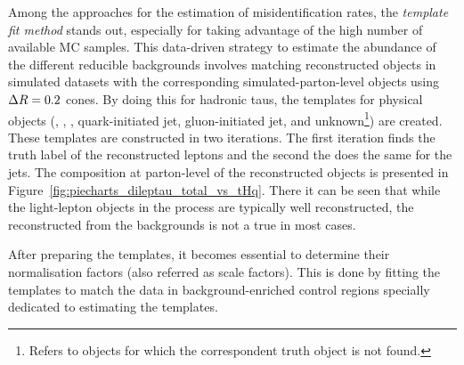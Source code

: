 

Among the approaches for the estimation of misidentification rates, the \textit{template fit method} stands out, 
especially for taking advantage of the high number of available MC samples. This data-driven strategy to estimate the 
abundance of the different reducible backgrounds involves matching reconstructed objects in simulated 
datasets with the corresponding simulated-parton-level objects using $\Delta R=0.2$ cones. By doing this for hadronic taus, the 
templates for physical objects (\Pe, \Pmu, \tauhad, quark-initiated jet, gluon-initiated jet, and unknown\footnote{Refers
to objects for which the correspondent truth object is not found.}) 
are created. These templates are constructed %
in two iterations. The first iteration finds the truth label of the reconstructed leptons and the second the does
the same for the jets. %
The composition at parton-level of the reconstructed objects is presented in Figure~\ref{fig:piecharts_dileptau_total_vs_tHq}. 
There it can be seen that while the light-lepton objects in the \tHq process are typically well reconstructed, the reconstructed \tauhad 
from the backgrounds is not a true \Ptau in most cases. 

After preparing the templates, it becomes essential to determine their normalisation factors (also referred as scale factors). 
This is done by fitting the templates to match the
data in background-enriched control regions specially dedicated to estimating the templates.




